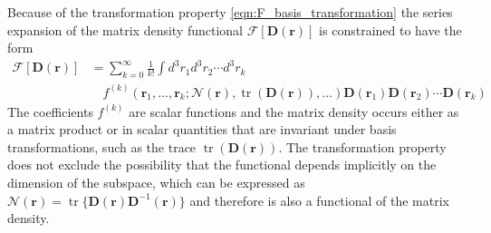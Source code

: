 \documentclass[journal=jpclcd,manuscript=letter]{achemso}
\DeclareMathOperator{\tr}{tr}
\newcommand\m[1]{\mathbf{#1}}
\renewcommand\vec[1]{\mathbf{#1}}
\begin{document}
Because of the transformation property \ref{eqn:F_basis_transformation} the series expansion of the matrix density functional
$\m{\mathcal{F}}[\m{D}(\vec{r})]$ is constrained to have the form
\begin{equation}
 \begin{split}
   \m{\mathcal{F}}[\m{D}(\vec{r})] &= \sum_{k=0}^{\infty} \frac{1}{k!} \int d^3\!r_1 d^3\!r_2 \cdots d^3\!r_k ~ \\
   & \quad f^{(k)}(\vec{r}_1,\ldots,\vec{r}_k; \mathcal{N}(\vec{r}), \tr(\m{D}(\vec{r})), \ldots) \m{D}(\vec{r}_1) \m{D}(\vec{r}_2) \cdots \m{D}(\vec{r}_k) \label{eqn:functional_taylor_expansion}
 \end{split}
\end{equation}
The coefficients $f^{(k)}$ are scalar functions and the matrix density occurs either as a matrix product or in scalar quantities that are invariant under basis transformations, such as the trace $\tr(\mathbf{D}(\vec{r}))$.
The transformation property does not exclude the possibility that the functional depends implicitly on the dimension of the subspace, which can be expressed as $\mathcal{N}(\vec{r}) = \tr\{\m{D}(\vec{r}) \m{D}^{-1}(\vec{r})\}$ and therefore is also a functional of the matrix density.
\end{document}
